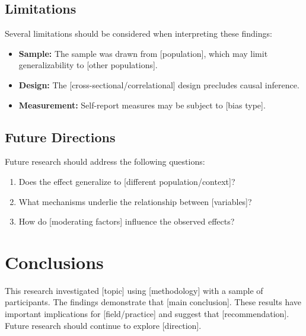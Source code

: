 \documentclass[11pt,letterpaper]{report}
\begin{document}
\section{Limitations}

\begin{limitations}
Several limitations should be considered when interpreting these findings:
\begin{itemize}
    \item \textbf{Sample:} The sample was drawn from [population], which may limit generalizability to [other populations].
    \item \textbf{Design:} The [cross-sectional/correlational] design precludes causal inference.
    \item \textbf{Measurement:} Self-report measures may be subject to [bias type].
\end{itemize}
\end{limitations}

\section{Future Directions}

Future research should address the following questions:

\begin{enumerate}
    \item Does the effect generalize to [different population/context]?
    \item What mechanisms underlie the relationship between [variables]?
    \item How do [moderating factors] influence the observed effects?
\end{enumerate}


\chapter{Conclusions}

\begin{executivesummary}[Conclusion]
This research investigated [topic] using [methodology] with a sample of  participants. The findings demonstrate that [main conclusion]. These results have important implications for [field/practice] and suggest that [recommendation]. Future research should continue to explore [direction].
\end{executivesummary}
\end{document}
